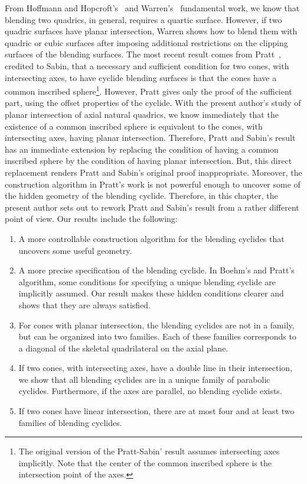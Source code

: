      From Hoffmann and 
Hopcroft's~\cite{hoffmann-hopcroft:1986,hoffmann-hopcroft:1987,hoffmann-hopcroft:1988} 
 and Warren's~\cite{warren:1986,warren:1989} 
fundamental work, we know that 
blending two quadrics, in general, requires a quartic surface.  However,
if two quadric surfaces have planar intersection, Warren shows how to blend 
them with quadric or cubic surfaces after imposing additional restrictions
on the clipping surfaces of the blending surfaces.   The most recent
result comes from Pratt~\cite{pratt:1990}, credited to 
Sabin, that a necessary and sufficient condition for two cones, 
with intersecting axes, to have cyclide blending surfaces is that the cones 
have a common inscribed sphere\footnote{The original version of the 
Pratt-Sabin' result assumes
intersecting axes implicitly.  Note that the center of the common inscribed
sphere is the intersection point of the axes.}.  However, Pratt gives only
the proof of the sufficient part, using the offset properties of the cyclide.
With the present author's study of planar intersection of axial natural 
quadrics, we know immediately that the existence of a common inscribed sphere 
is equivalent to the cones, with intersecting axes, having planar 
intersection.  Therefore, Pratt and Sabin's result has an immediate extension
by replacing the condition of having a common inscribed sphere by the
condition of having planar intersection.  But, this direct replacement renders
Pratt and Sabin's original proof inappropriate.  Moreover, the construction
algorithm in Pratt's work is not powerful enough to uncover some of the hidden
geometry of the blending cyclide.  Therefore, in this chapter,
the present author sets out to rework Pratt and Sabin's result from a rather
different point of view.  Our results include the following:
\begin{enumerate}
     \item A more controllable construction algorithm for the blending 
          cyclides that uncovers some useful geometry.
     \item A more precise specification of the blending cyclide.  In
          Boehm's and Pratt's algorithm, some conditions for specifying
          a unique blending cyclide are implicitly assumed.  Our result
          makes these hidden conditions clearer and shows that they are always
          satisfied.
     \item For cones with planar intersection, the blending cyclides are not
          in a family, but can be organized into two families.  Each of these
          families corresponds to a diagonal of the skeletal quadrilateral
          on the axial plane.
     \item If two cones, with intersecting axes, have a double line in their
          intersection, we show that all blending cyclides are in a unique
          family of parabolic cyclides.  Furthermore, if the axes are
          parallel, no blending cyclide exists.
     \item If two cones have linear intersection, there are at most four and
          at least two families of blending cyclides.
\end{enumerate}

